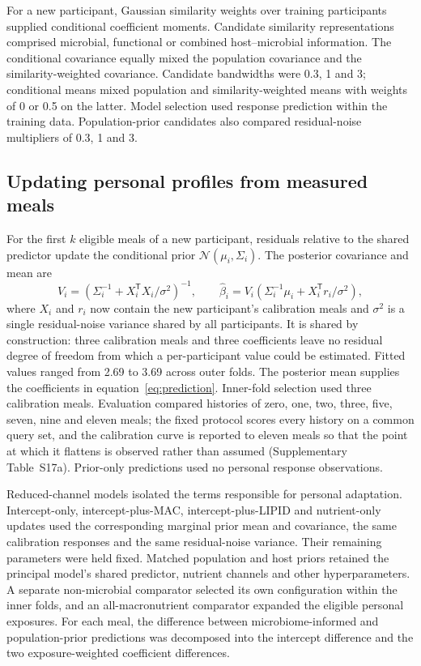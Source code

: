 \documentclass[pdflatex,sn-nature]{sn-jnl}
\theoremstyle{thmstyleone}
\theoremstyle{thmstyletwo}
\theoremstyle{thmstylethree}
\begin{document}
For a new participant, Gaussian similarity weights over training participants supplied conditional coefficient moments. Candidate similarity representations comprised microbial, functional or combined host--microbial information. The conditional covariance equally mixed the population covariance and the similarity-weighted covariance. Candidate bandwidths were 0.3, 1 and 3; conditional means mixed population and similarity-weighted means with weights of 0 or 0.5 on the latter. Model selection used response prediction within the training data. Population-prior candidates also compared residual-noise multipliers of 0.3, 1 and 3.

\subsection{Updating personal profiles from measured meals}

For the first $k$ eligible meals of a new participant, residuals relative to the shared predictor update the conditional prior $\mathcal N(\mu_i,\Sigma_i)$. The posterior covariance and mean are
\begin{equation}
V_i=\left(\Sigma_i^{-1}+X_i^{\mathsf T}X_i/\sigma^2\right)^{-1},
\qquad
\widehat\beta_i=V_i\left(\Sigma_i^{-1}\mu_i+X_i^{\mathsf T}r_i/\sigma^2\right),
\label{eq:update}
\end{equation}
where $X_i$ and $r_i$ now contain the new participant's calibration meals and $\sigma^2$ is a single residual-noise variance shared by all participants. It is shared by construction: three calibration meals and three coefficients leave no residual degree of freedom from which a per-participant value could be estimated. Fitted values ranged from 2.69 to 3.69 across outer folds. The posterior mean supplies the coefficients in equation~\ref{eq:prediction}. Inner-fold selection used three calibration meals. Evaluation compared histories of zero, one, two, three, five, seven, nine and eleven meals; the fixed protocol scores every history on a common query set, and the calibration curve is reported to eleven meals so that the point at which it flattens is observed rather than assumed (Supplementary Table~S17a). Prior-only predictions used no personal response observations.

Reduced-channel models isolated the terms responsible for personal adaptation. Intercept-only, intercept-plus-MAC, intercept-plus-LIPID and nutrient-only updates used the corresponding marginal prior mean and covariance, the same calibration responses and the same residual-noise variance. Their remaining parameters were held fixed. Matched population and host priors retained the principal model's shared predictor, nutrient channels and other hyperparameters. A separate non-microbial comparator selected its own configuration within the inner folds, and an all-macronutrient comparator expanded the eligible personal exposures. For each meal, the difference between microbiome-informed and population-prior predictions was decomposed into the intercept difference and the two exposure-weighted coefficient differences.
\end{document}
